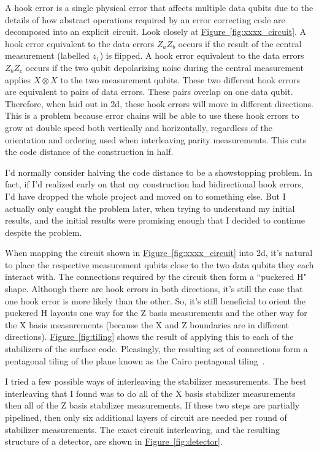 \documentclass[onecolumn,unpublished,a4paper]{quantumarticle}
\theoremstyle{definition}
\theoremstyle{definition}
\theoremstyle{definition}
\newcommand{\fig}[1]{\hyperref[fig:#1]{Figure~\ref*{fig:#1}}}
\begin{document}
A hook error is a single physical error that affects multiple data qubits due to the details of how abstract operations required by an error correcting code are decomposed into an explicit circuit.
Look closely at \fig{xxxx_circuit}.
A hook error equivalent to the data errors $Z_a Z_b$ occurs if the result of the central measurement (labelled $z_1$) is flipped.
A hook error equivalent to the data errors $Z_b Z_c$ occurs if the two qubit depolarizing noise during the central measurement applies $X \otimes X$ to the two measurement qubits.
These two different hook errors are equivalent to pairs of data errors.
These pairs overlap on one data qubit.
Therefore, when laid out in 2d, these hook errors will move in different directions.
This is a problem because error chains will be able to use these hook errors to grow at double speed both vertically and horizontally, regardless of the orientation and ordering used when interleaving parity measurements.
This cuts the code distance of the construction in half.

I'd normally consider halving the code distance to be a showstopping problem.
In fact, if I'd realized early on that my construction had bidirectional hook errors, I'd have dropped the whole project and moved on to something else.
But I actually only caught the problem later, when trying to understand my initial results, and the initial results were promising enough that I decided to continue despite the problem.

When mapping the circuit shown in \fig{xxxx_circuit} into 2d, it's natural to place the respective measurement qubits close to the two data qubits they each interact with.
The connections required by the circuit then form a ``puckered H" shape.
Although there are hook errors in both directions, it's still the case that one hook error is more likely than the other.
So, it's still beneficial to orient the puckered H layouts one way for the Z basis measurements and the other way for the X basis measurements (because the X and Z boundaries are in different directions).
\fig{tiling} shows the result of applying this to each of the stabilizers of the surface code.
Pleasingly, the resulting set of connections form a pentagonal tiling of the plane known as the Cairo pentagonal tiling~\cite{wiki:Cairo_pentagonal_tiling}.

I tried a few possible ways of interleaving the stabilizer measurements.
The best interleaving that I found was to do all of the X basis stabilizer measurements then all of the Z basis stabilizer measurements.
If these two steps are partially pipelined, then only six additional layers of circuit are needed per round of stabilizer measurements.
The exact circuit interleaving, and the resulting structure of a detector, are shown in \fig{detector}.
\end{document}
